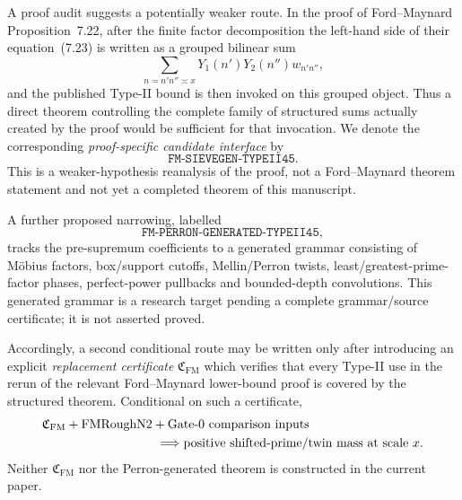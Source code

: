 \documentclass[11pt]{article}
\theoremstyle{definition}
\newcommand{\1}{\mathbf 1}
\begin{document}
A proof audit suggests a potentially weaker route.  In the proof of
Ford--Maynard Proposition~7.22, after the finite factor decomposition the
left-hand side of their equation~(7.23) is written as a grouped bilinear sum
\[
    \sum_{n=n'n''\asymp x}Y_1(n')Y_2(n'')w_{n'n''},
\]
and the published Type-II bound is then invoked on this grouped object.  Thus
a direct theorem controlling the complete family of structured sums actually
created by the proof would be sufficient for that invocation.  We denote the
corresponding \emph{proof-specific candidate interface} by
\[
   \boxed{\texttt{FM-SIEVEGEN-TYPEII45}}.
\]
This is a weaker-hypothesis reanalysis of the proof, not a Ford--Maynard theorem
statement and not yet a completed theorem of this manuscript.

A further proposed narrowing, labelled
\[
   \boxed{\texttt{FM-PERRON-GENERATED-TYPEII45}},
\]
tracks the pre-supremum coefficients to a generated grammar consisting of
Möbius factors, box/support cutoffs, Mellin/Perron twists,
least/greatest-prime-factor phases, perfect-power pullbacks and bounded-depth
convolutions.  This generated grammar is a research target pending a complete
grammar/source certificate; it is not asserted proved.

Accordingly, a second conditional route may be written only after introducing
an explicit \emph{replacement certificate} $\mathfrak C_{\mathrm{FM}}$ which
verifies that every Type-II use in the rerun of the relevant Ford--Maynard
lower-bound proof is covered by the structured theorem.  Conditional on such a
certificate,
\begin{equation}
\begin{aligned}
 &\mathfrak C_{\mathrm{FM}}
 +\mathrm{FMRoughN2}
 +\text{Gate-0 comparison inputs}\\
 &\hspace{32mm}\Longrightarrow
 \text{positive shifted-prime/twin mass at scale }x.
\end{aligned}
\label{eq:gate2-structured-route}
\end{equation}
Neither $\mathfrak C_{\mathrm{FM}}$ nor the Perron-generated theorem is
constructed in the current paper.
\end{document}
